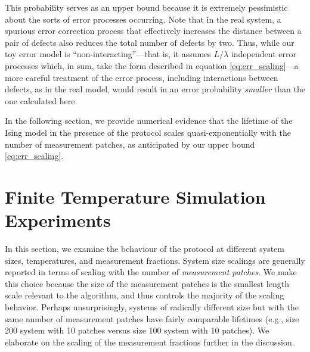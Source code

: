 \documentclass[twocolumn,superscriptaddress,aps,prb,floatfix]{revtex4-1}
\begin{document}
 This probability serves as an upper bound because it is extremely pessimistic about the sorts of error processes occurring.  Note that in the real system, a spurious error correction process that effectively increases the distance between a pair of defects also reduces the total number of defects by two.  Thus, while our toy error model is ``non-interacting''---that is, it assumes $L/\lambda$ independent error processes which, in sum, take the form described in equation \ref{eq:err_scaling}---a more careful treatment of the error process, including interactions between defects, as in the real model, would result in an error probability \emph{smaller} than the one calculated here.
 
 In the following section, we provide numerical evidence that the lifetime of the Ising model in the presence of the protocol scales quasi-exponentially with the number of measurement patches, as anticipated by our upper bound \ref{eq:err_scaling}.
 

 
\section{Finite Temperature Simulation Experiments}
\label{sec:experiments}

In this section, we examine the behaviour of the protocol at different system sizes, temperatures, and measurement fractions.  System size scalings are generally reported in terms of scaling with the number of \emph{measurement patches}.  We make this choice because the size of the measurement patches is the smallest length scale relevant to the algorithm, and thus controls the majority of the scaling behavior.  Perhaps unsurprisingly, systems of radically different size but with the same number of measurement patches have fairly comparable lifetimes (e.g., size 200 system with 10 patches versus size 100 system with 10 patches).  We elaborate on the scaling of the measurement fractions further in the discussion.
\end{document}
